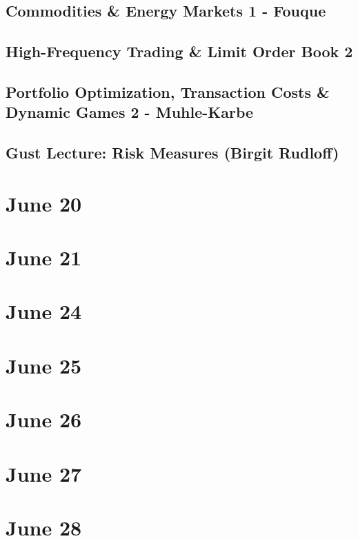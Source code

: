 \documentclass[twocolumn,openany]{book}
\begin{document}
\chapter{Commodities \& Energy Markets 1 - Fouque}
\chapter{High-Frequency Trading \& Limit Order Book 2}
\chapter{Portfolio Optimization, Transaction Costs \& Dynamic Games 2 - Muhle-Karbe}
\chapter{Gust Lecture: Risk Measures (Birgit Rudloff)}

\part{June 20}
\part{June 21}
\part{June 24}
\part{June 25}
\part{June 26}
\part{June 27}
\part{June 28}



\end{document}
